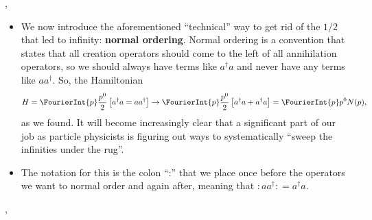 \sep

\begin{itemize}
    \item We now introduce the aforementioned ``technical'' way to get rid of the $1/2$ that led to infinity: \textbf{normal ordering}. Normal ordering is a convention that states that all creation operators should come to the left of all annihilation operators, so we should always have terms like $a^{\dagger}a$ and never have any terms like $aa^{\dagger}$. So, the Hamiltonian
        \begin{equation*}
            H = \FourierInt{p} \frac{p^0}{2} \left[ a^{\dagger}a = aa^{\dagger} \right] \rightarrow \FourierInt{p} \frac{p^0}{2} \left[ a^{\dagger}a + a^{\dagger}a \right] = \FourierInt{p} p^0 N(p),
        \end{equation*}
        as we found. It will become increasingly clear that a significant part of our job as particle physicists is figuring out ways to systematically ``sweep the infinities under the rug''.
    \item The notation for this is the colon ``:'' that we place once before the operators we want to normal order and again after, meaning that $: aa^{\dagger} : = a^{\dagger}a$.
\end{itemize}

\sep

